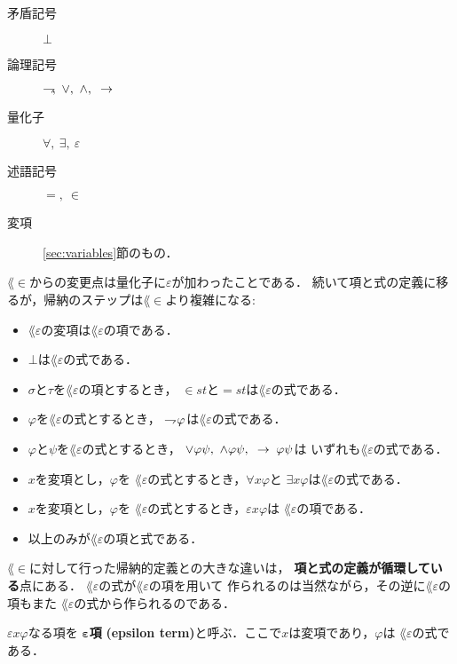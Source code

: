 	\begin{description}
		\item[矛盾記号] $\bot$
		\item[論理記号] $\negation,\ \vee,\ \wedge,\ \rarrow$
		\item[量化子] $\forall,\ \exists,\ \varepsilon$
		\item[述語記号] $=,\ \in$
		\item[変項] \ref{sec:variables}節のもの．
	\end{description}
	
	$\lang{\in}$からの変更点は量化子に$\varepsilon$が加わったことである．
	続いて項と式の定義に移るが，帰納のステップは$\lang{\in}$より複雑になる:
	
	\begin{itemize}
		\item $\lang{\varepsilon}$の変項は$\lang{\varepsilon}$の項である．
		\item $\bot$は$\lang{\varepsilon}$の式である．
		\item $\sigma$と$\tau$を$\lang{\varepsilon}$の項とするとき，
			$\in st$と$=st$は$\lang{\varepsilon}$の式である．
		\item $\varphi$を$\lang{\varepsilon}$の式とするとき，
			$\rightharpoondown\hspace{-0.25em} \varphi$は$\lang{\varepsilon}$の式である．
		\item $\varphi$と$\psi$を$\lang{\varepsilon}$の式とするとき，
			$\vee \varphi \psi,\ \wedge \varphi \psi,\ \rarrow \varphi \psi$は
			いずれも$\lang{\varepsilon}$の式である．
		\item $x$を変項とし，$\varphi$を
			$\lang{\varepsilon}$の式とするとき，$\forall x \varphi$と
			$\exists x \varphi$は$\lang{\varepsilon}$の式である．
		\item $x$を変項とし，$\varphi$を
			$\lang{\varepsilon}$の式とするとき，$\varepsilon x \varphi$は
			$\lang{\varepsilon}$の項である．
		\item 以上のみが$\lang{\varepsilon}$の項と式である．
	\end{itemize}
	
	$\lang{\in}$に対して行った帰納的定義との大きな違いは，
	{\bf 項と式の定義が循環している}点にある．
	$\lang{\varepsilon}$の式が$\lang{\varepsilon}$の項を用いて
	作られるのは当然ながら，その逆に$\lang{\varepsilon}$の項もまた
	$\lang{\varepsilon}$の式から作られるのである．
	
	\begin{screen}
		\begin{dfn}[$\varepsilon$項]
			$\varepsilon x \varphi$なる項を
			{\bf ${\boldsymbol \varepsilon}$項}
			{\bf (epsilon term)}と呼ぶ．ここで$x$は変項であり，$\varphi$は
			$\lang{\varepsilon}$の式である．
		\end{dfn}
	\end{screen}
	
